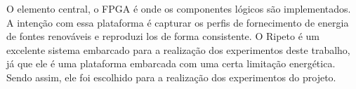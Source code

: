 O elemento central, o FPGA é onde os  componentes lógicos são implementados. A intenção com essa plataforma é capturar os  perfis de fornecimento de energia de fontes renováveis e reproduzi los de forma consistente. O Ripeto é um excelente sistema embarcado para a realização dos experimentos deste trabalho, já que ele é uma plataforma embarcada com uma certa limitação energética. Sendo assim, ele foi escolhido para a realização dos experimentos do projeto.  
 

